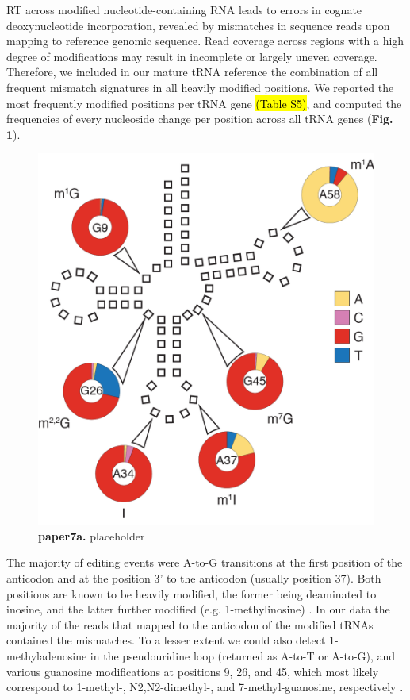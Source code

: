 \documentclass[12pt]{rockefeller}
\begin{document}
RT across modified nucleotide-containing RNA leads to errors in cognate deoxynucleotide incorporation, revealed by mismatches in sequence reads upon mapping to reference genomic sequence. Read coverage across regions with a high degree of modifications may result in incomplete or largely uneven coverage. Therefore, we included in our mature tRNA reference the combination of all frequent mismatch signatures in all heavily modified positions. We reported the most frequently modified positions per tRNA gene \hl{(Table S5)}, and computed the frequencies of every nucleoside change per position across all tRNA genes (\textbf{Fig. \ref{paper7a}}). 

\begin{figure}[!ht]%
\centering
\includegraphics[scale=1]{paper7a.png}%
\caption[paper7a]
{\textbf{paper7a.}
placeholder}
\centering
\label{paper7a}%
\end{figure}

The majority of editing events were A-to-G transitions at the first position of the anticodon and at the position 3’ to the anticodon (usually position 37). Both positions are known to be heavily modified, the former being deaminated to inosine, and the latter further modified (e.g. 1-methylinosine) \cite{Machnicka:2013ky}. In our data the majority of the reads that mapped to the anticodon of the modified tRNAs contained the mismatches. To a lesser extent we could also detect 1-methyladenosine in the pseudouridine loop (returned as A-to-T or A-to-G), and various guanosine modifications at positions 9, 26, and 45, which most likely correspond to 1-methyl-, N2,N2-dimethyl-, and 7-methyl-guanosine, respectively \cite{Machnicka:2013ky}.
\end{document}
